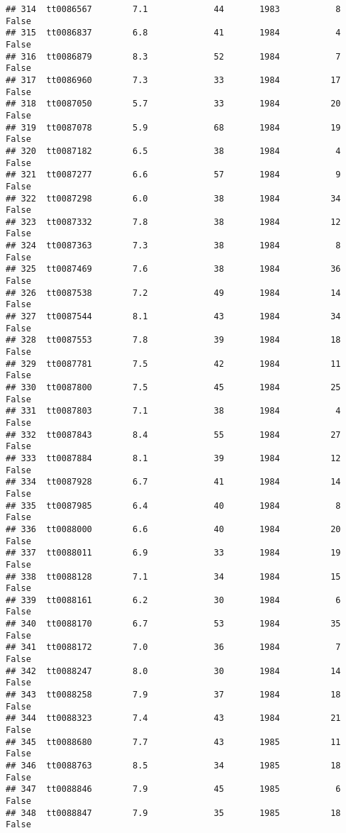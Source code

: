 \documentclass[
]{article}
\begin{document}
\begin{verbatim}
## 314  tt0086567        7.1             44       1983           8   False
## 315  tt0086837        6.8             41       1984           4   False
## 316  tt0086879        8.3             52       1984           7   False
## 317  tt0086960        7.3             33       1984          17   False
## 318  tt0087050        5.7             33       1984          20   False
## 319  tt0087078        5.9             68       1984          19   False
## 320  tt0087182        6.5             38       1984           4   False
## 321  tt0087277        6.6             57       1984           9   False
## 322  tt0087298        6.0             38       1984          34   False
## 323  tt0087332        7.8             38       1984          12   False
## 324  tt0087363        7.3             38       1984           8   False
## 325  tt0087469        7.6             38       1984          36   False
## 326  tt0087538        7.2             49       1984          14   False
## 327  tt0087544        8.1             43       1984          34   False
## 328  tt0087553        7.8             39       1984          18   False
## 329  tt0087781        7.5             42       1984          11   False
## 330  tt0087800        7.5             45       1984          25   False
## 331  tt0087803        7.1             38       1984           4   False
## 332  tt0087843        8.4             55       1984          27   False
## 333  tt0087884        8.1             39       1984          12   False
## 334  tt0087928        6.7             41       1984          14   False
## 335  tt0087985        6.4             40       1984           8   False
## 336  tt0088000        6.6             40       1984          20   False
## 337  tt0088011        6.9             33       1984          19   False
## 338  tt0088128        7.1             34       1984          15   False
## 339  tt0088161        6.2             30       1984           6   False
## 340  tt0088170        6.7             53       1984          35   False
## 341  tt0088172        7.0             36       1984           7   False
## 342  tt0088247        8.0             30       1984          14   False
## 343  tt0088258        7.9             37       1984          18   False
## 344  tt0088323        7.4             43       1984          21   False
## 345  tt0088680        7.7             43       1985          11   False
## 346  tt0088763        8.5             34       1985          18   False
## 347  tt0088846        7.9             45       1985           6   False
## 348  tt0088847        7.9             35       1985          18   False

\end{verbatim}
\end{document}
